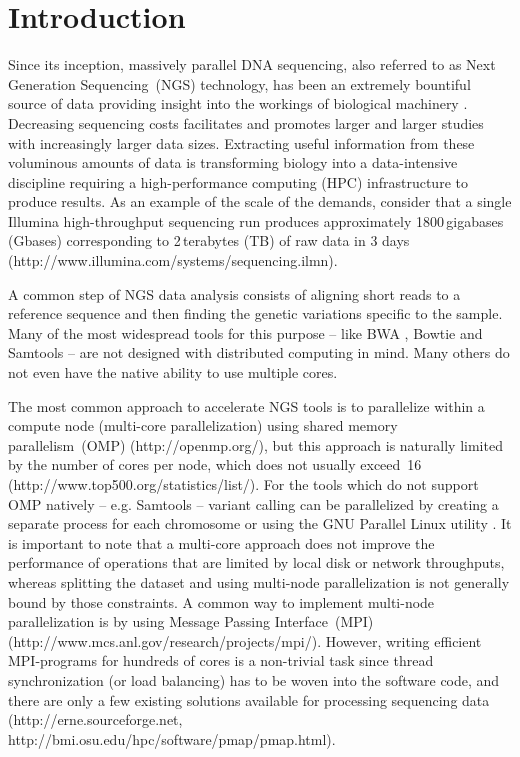 \documentclass{bioinfo}
\begin{document}
\section{Introduction}
Since its inception, massively parallel DNA sequencing, also referred to as Next Generation Sequencing~(NGS) technology, has been an extremely bountiful source of data providing insight into the workings of biological machinery \citep{metzker, Marx:2013fk}. Decreasing sequencing costs facilitates and promotes larger and larger studies with increasingly larger data sizes. Extracting useful information from these voluminous amounts of data is transforming biology into a data-intensive discipline requiring a high-performance computing (HPC) infrastructure to produce results.  As an example of the scale of the demands, consider that a single Illumina high-throughput sequencing run produces approximately 1800\,gigabases (Gbases) corresponding to 2\,terabytes (TB) of raw data in 3 days (http://www.illumina.com/systems/sequencing.ilmn).

A common step of NGS data analysis consists of aligning short reads to a reference sequence and then finding the genetic variations specific to the sample.
Many of the most widespread tools for this purpose -- like BWA \citep{bwa}, Bowtie \citep{Langmead:2009uq} and Samtools \citep{samtools} -- are not designed with distributed computing in mind. Many others do not even have the native ability to use multiple cores.

The most common approach to accelerate NGS tools is to parallelize within a compute node (multi-core parallelization) using shared memory parallelism~(OMP) (http://openmp.org/), but this approach is naturally limited by the number of cores per node, which does not usually exceed~16 (http://www.top500.org/statistics/list/). For the tools which do not support OMP natively -- e.g. Samtools -- variant calling can be parallelized by creating a separate process for each chromosome or using the GNU Parallel Linux utility \citep{Tange2011a}.
It is important to note that a multi-core approach does not improve the performance of operations that are limited by local disk or network throughputs, whereas splitting the dataset and using multi-node parallelization is not generally bound by those constraints. A common way to implement multi-node parallelization is by using Message Passing Interface~(MPI) (http://www.mcs.anl.gov/research/projects/mpi/). However, writing efficient MPI-programs for hundreds of cores is a non-trivial task since thread synchronization (or load balancing) has to be woven into the software code, and there are only a few existing solutions available for processing sequencing data \citep{gnumap} (http://erne.sourceforge.net, http://bmi.osu.edu/hpc/software/pmap/pmap.html).
\end{document}
